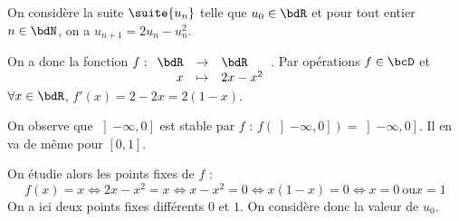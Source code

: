 \documentclass[a4paper,french,bookmarks]{article}
\begin{document}
\begin{example}{}{}
    On considère la suite $\suite{u_n}$ telle que $u_0 \in \bdR$ et pour tout entier $n \in \bdN$, on a $u_{n+1} = 2u_n - u_n^2$.
    
    \tcblower
    
    \begin{enumerate}
        \ithand On a donc la fonction $f : \begin{array}[t]{rcl}
            \bdR & \to &\bdR  \\
            x & \mapsto & 2x - x^2
        \end{array}$. Par opérations $f \in \bcD$ et $\forall x \in \bdR$, $f'(x) = 2 - 2x = 2(1-x)$.
        
        \begin{center}
        \end{center}
        
        On observe que $\left]-\infty, 0\right]$ est stable par $f$ : $f\left(\left]-\infty, 0\right]\right) = \left]-\infty, 0\right]$. Il en va de même pour $\left[0, 1\right]$.
        
        \ithand On étudie alors les points fixes de $f$ :
        \[ f(x) = x \iff 2x - x^2 = x \iff x - x^2 = 0 \iff x(1-x) = 0 \iff x = 0 \ \text{ou} x = 1\]
        On a ici deux points fixes différents $0$ et $1$. On considère donc la valeur de $u_0$.
        
        \begin{minipage}{0.35\linewidth}
            \pgfplotsset{width=\textwidth}
\end{minipage}
\end{enumerate}
\end{example}
\end{document}
